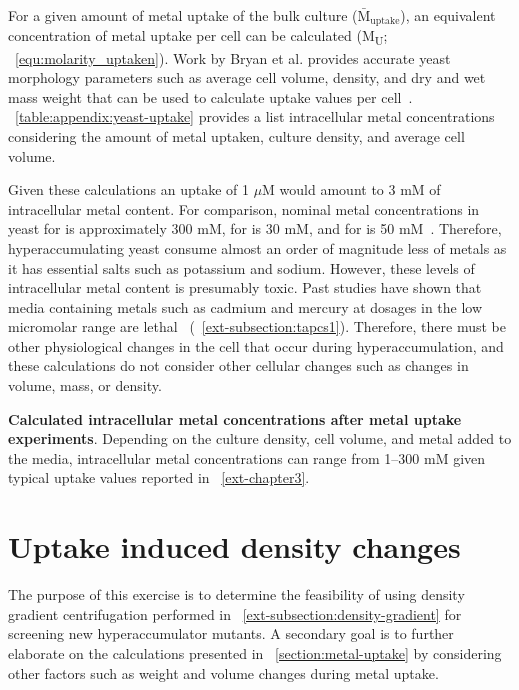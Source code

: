 \documentclass[../main/main]{subfiles}
\begin{document}
For a given amount of metal uptake of the bulk culture ($\bar{\text{M}}_{\text{uptake}}$), an equivalent concentration of metal uptake per cell can be calculated (M\textsubscript{U}; \EQUATION~\ref{equ:molarity_uptaken}). Work by Bryan et al. provides accurate yeast morphology parameters such as average cell volume, density, and dry and wet mass weight that can be used to calculate uptake values per cell~\cite{bryan2010measurement}.
\TABLE~\ref{table:appendix:yeast-uptake} provides a list intracellular metal concentrations considering the amount of metal uptaken, culture density, and average cell volume.

Given these calculations an uptake of 1 $\mu$M would amount to 3 mM of intracellular metal content. For comparison, nominal metal concentrations in yeast for  is approximately 300 mM, for  is 30 mM, and for  is 50 mM~\cite{philips2015}. Therefore, hyperaccumulating yeast consume almost an order of magnitude less of metals as it has essential salts such as potassium and sodium. However, these levels of intracellular metal content is presumably toxic. Past studies have shown that media containing metals such as cadmium and mercury at dosages in the low micromolar range are lethal~\cite{wang2012} (\CHAPTER~\ref{ext-subsection:tapcs1}). Therefore, there must be other physiological changes in the cell that occur during hyperaccumulation, and these calculations do not consider other cellular changes such as changes in volume, mass, or density.

\begin{table}[H]
\singlespacing
\setlength\extrarowheight{1pt}
	\centering
		
	\caption[Calculated intracellular metal concentrations after metal uptake experiments]
	{
		\textbf{Calculated intracellular metal concentrations after metal uptake experiments}. Depending on the culture density, cell volume, and metal added to the media, intracellular metal concentrations can range from 1--300 mM given typical uptake values reported in \CHAPTER~\ref{ext-chapter3}.
	}
	\label{table:appendix:yeast-uptake}
\end{table}

\section{Uptake induced density changes}
The purpose of this exercise is to determine the feasibility of using density gradient centrifugation performed in \CHAPTER~\ref{ext-subsection:density-gradient} for screening new hyperaccumulator mutants. A secondary goal is to further elaborate on the calculations presented in \SECTION~\ref{section:metal-uptake} by considering other factors such as weight and volume changes during metal uptake.
\end{document}
